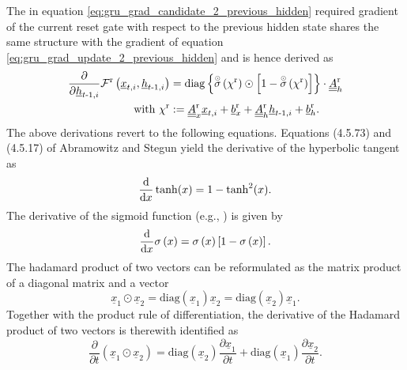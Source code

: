 The in equation \ref{eq:gru_grad_candidate_2_previous_hidden} 
required gradient of the current reset gate
with respect to the previous hidden state shares the same structure
with the gradient of equation \ref{eq:gru_grad_update_2_previous_hidden} 
and is hence derived as
\begin{align}
    \frac{\partial}{\partial \underline h_{t\text{-}1, i}}
    \mathcal{F}^\text{r} \left(\underline x_{t, i}, \underline h_{t\text{-}1, i}\right)
    &=
    \mathrm{diag} \left\{
        \overset{\scriptscriptstyle \odot}{\sigma} \left(\chi^\text{r}\right)
        \odot
        \left[
            1 -  \overset{\scriptscriptstyle \odot}{\sigma} \left(\chi^\text{r}\right)
        \right]
    \right\}
    \cdot \underline{\underline A}^\text{r}_{h}
    \nonumber \\
    \text{with } \chi^\text{r} & :=
    \underline{\underline A}^\text{r}_{x}
            \underline x_{t,i}
            +
            \underline b^\text{r}_{x}
            +
            \underline{\underline A}^\text{r}_{h}
            \underline h_{t\text -1,i}
            +
            \underline b^\text{r}_{h}.
\end{align}
The above derivations revert to the following equations.
Equations (4.5.73) and (4.5.17) of Abramowitz and Stegun \cite{D.1966}
yield the derivative of the hyperbolic tangent as
\begin{equation} \label{eq:derivative_tanh}
    \frac{\text d}{\text d x} \tanh (x) = 1 - \tanh^2 (x).
\end{equation}
The derivative of the sigmoid function (e.g., \cite{Minai1993})
is given by
\begin{equation} \label{eq:derivative_sigmoid}
    \frac{\text d}{\text d x} \sigma \left(x\right) 
    = 
    \sigma \left(x\right) 
    \left[
        1 - \sigma \left(x\right)
    \right].
\end{equation}
The hadamard product of two vectors can be reformulated as the
matrix product of a diagonal matrix and a vector \cite{Brookes2020}
\begin{equation} \label{eq:hadamard_product_two_vectors}
    \underline x_1 \odot \underline x_2 
= 
    \mathrm{diag} \left(\underline x_1\right) \underline x_2 
=   
    \mathrm{diag} \left(\underline x_2\right) \underline x_1.
\end{equation}
Together with the product rule of differentiation, the derivative of the Hadamard product of two vectors 
is therewith identified as
\begin{equation} \label{eq:differentiation_hadamard_product_two_vectors}
    \frac{\partial}{\partial t} \left(
        \underline x_1 \odot \underline x_2 
    \right)
    =   
    \mathrm{diag} \left(\underline x_2\right)
    \frac{\partial \underline x_1}{\partial t} 
    +
    \mathrm{diag} \left(\underline x_1\right)
    \frac{\partial \underline x_2}{\partial t}.
\end{equation}
